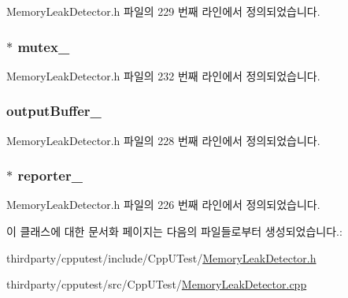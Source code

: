 Memory\+Leak\+Detector.\+h 파일의 229 번째 라인에서 정의되었습니다.

\subsubsection[{\texorpdfstring{mutex\+\_\+}{mutex_}}]{$\ast$ mutex\+\_\+\hspace{0.3cm}{\ttfamily [private]}}\hypertarget{class_memory_leak_detector_ab92d2f1606fbc62f3c4d5184d735dd04}{}\label{class_memory_leak_detector_ab92d2f1606fbc62f3c4d5184d735dd04}


Memory\+Leak\+Detector.\+h 파일의 232 번째 라인에서 정의되었습니다.

\subsubsection[{\texorpdfstring{output\+Buffer\+\_\+}{outputBuffer_}}]{ output\+Buffer\+\_\+\hspace{0.3cm}{\ttfamily [private]}}\hypertarget{class_memory_leak_detector_a7d0b175420d83f9ee397b398ae14ac75}{}\label{class_memory_leak_detector_a7d0b175420d83f9ee397b398ae14ac75}


Memory\+Leak\+Detector.\+h 파일의 228 번째 라인에서 정의되었습니다.

\subsubsection[{\texorpdfstring{reporter\+\_\+}{reporter_}}]{$\ast$ reporter\+\_\+\hspace{0.3cm}{\ttfamily [private]}}\hypertarget{class_memory_leak_detector_a632df6e6476c93d9c58a104a17e155d9}{}\label{class_memory_leak_detector_a632df6e6476c93d9c58a104a17e155d9}


Memory\+Leak\+Detector.\+h 파일의 226 번째 라인에서 정의되었습니다.



이 클래스에 대한 문서화 페이지는 다음의 파일들로부터 생성되었습니다.\+:\begin{DoxyCompactItemize}
\item 
thirdparty/cpputest/include/\+Cpp\+U\+Test/\hyperlink{_memory_leak_detector_8h}{Memory\+Leak\+Detector.\+h}\item 
thirdparty/cpputest/src/\+Cpp\+U\+Test/\hyperlink{_memory_leak_detector_8cpp}{Memory\+Leak\+Detector.\+cpp}\end{DoxyCompactItemize}
